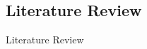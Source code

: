 \documentclass[10pt]{beamer}
\begin{document}
\begin{frame}
\section{Literature Review}
\centering \LARGE Literature Review
\end{frame}
\end{document}
